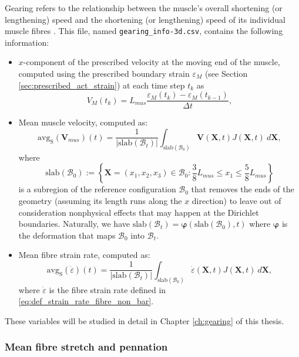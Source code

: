 \documentclass{sfuthesis}
\numberwithin{equation}{section}
\numberwithin{figure}{chapter}
\numberwithin{table}{chapter}
\theoremstyle{definition}
\def\*#1{{\mathbf{#1}}} %
\newcommand{\B}{\mathcal{B}}
\begin{document}
Gearing refers to the relationship between the muscle's overall shortening (or lengthening) speed and the shortening (or lengthening) speed of its individual muscle fibres \cite{Eng2018,Randhawa2013}. This file, named \texttt{gearing\_info-3d.csv}, contains the following information:
\begin{itemize}
    \item $x$-component of the prescribed velocity at the moving end of the muscle, computed using the prescribed boundary strain $\varepsilon_M$ (see Section \ref{sec:prescribed_act_strain}) at each time step $t_k$ as
    \begin{equation}
        V_M(t_k) = L_{mus} \dfrac{\varepsilon_M(t_k) - \varepsilon_M(t_{k-1})}{\Delta t},
    \end{equation}
    \item Mean muscle velocity, computed as:
    \begin{equation}
        \mathrm{avg}_\mathrm{S}(\*V_{mus})(t) = \dfrac{1}{|\mathrm{slab}(\B_t)|} \int_{\mathrm{slab}(\B_0)} \*V(\*X,t) J(\*X,t) \ d\*X,
    \end{equation}
    where
    \begin{equation}
        \mathrm{slab}(\B_0) := \left\{ \*X = (x_1,x_2,x_3) \in \B_0 : \dfrac{3}{8}L_{mus} \leq x_1 \leq \dfrac{5}{8} L_{mus} \right\}
    \end{equation}
    is a subregion of the reference configuration $\B_0$ that removes the ends of the geometry (assuming its length runs along the $x$ direction) to leave out of consideration nonphysical effects that may happen at the Dirichlet boundaries. Naturally, we have $\mathrm{slab}(\B_t) = \bm{\varphi} \left(\mathrm{slab}(\B_0), t \right)$ where $\bm{\varphi}$ is the deformation that maps $\B_0$ into $\B_t$.
    \item Mean fibre strain rate, computed as:
    \begin{equation} \label{eq:def_mean_fibre_strain_rate}
        \mathrm{avg}_\mathrm{S}(\dot{\varepsilon})(t) = \dfrac{1}{|\mathrm{slab}(\B_t)|} \int_{\mathrm{slab}(\B_0)} \dot{\varepsilon}(\*X,t) J(\*X,t) \ d\*X,
    \end{equation}
    where $\dot{\varepsilon}$ is the fibre strain rate defined in \eqref{eq:def_strain_rate_fibre_non_bar}. 
\end{itemize}
These variables will be studied in detail in Chapter \ref{ch:gearing} of this thesis.

\subsubsection{Mean fibre stretch and pennation}
\end{document}
